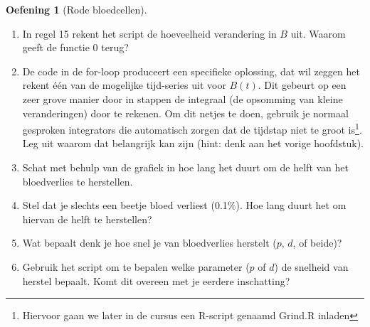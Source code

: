 \documentclass[
  a4paper,
]{scrbook}
\providecommand{\tightlist}{%
  \setlength{\itemsep}{0pt}\setlength{\parskip}{0pt}}\usepackage{longtable,booktabs,array}
\theoremstyle{definition}
\newtheorem{exercise}{Oefening}[chapter]
\theoremstyle{remark}
\begin{document}
\begin{exercise}[Rode
bloedcellen]
\begin{enumerate}
\def\labelenumi{\alph{enumi}.}
\setcounter{enumi}{7}
\tightlist
\item
  In regel 15 rekent het script de hoeveelheid verandering in \(B\) uit.
  Waarom geeft de functie \(0\) terug?
\item
  De code in de for-loop produceert een specifieke oplossing, dat wil
  zeggen het rekent één van de mogelijke tijd-series uit voor \(B(t)\).
  Dit gebeurt op een zeer grove manier door in stappen de integraal (de
  opsomming van kleine veranderingen) door te rekenen. Om dit netjes te
  doen, gebruik je normaal gesproken integrators die automatisch zorgen
  dat de tijdstap niet te groot is\footnote{Hiervoor gaan we later in de
    cursus een R-script genaamd Grind.R inladen}. Leg uit waarom dat
  belangrijk kan zijn (hint: denk aan het vorige hoofdstuk).
\item
  Schat met behulp van de grafiek in hoe lang het duurt om de helft van
  het bloedverlies te herstellen.
\item
  Stel dat je slechts een beetje bloed verliest (0.1\%). Hoe lang duurt
  het om hiervan de helft te herstellen?
\item
  Wat bepaalt denk je hoe snel je van bloedverlies herstelt (\(p\),
  \(d\), of beide)?
\item
  Gebruik het script om te bepalen welke parameter (\(p\) of \(d\)) de
  snelheid van herstel bepaalt. Komt dit overeen met je eerdere
  inschatting?
\end{enumerate}

\end{exercise}
\end{document}
